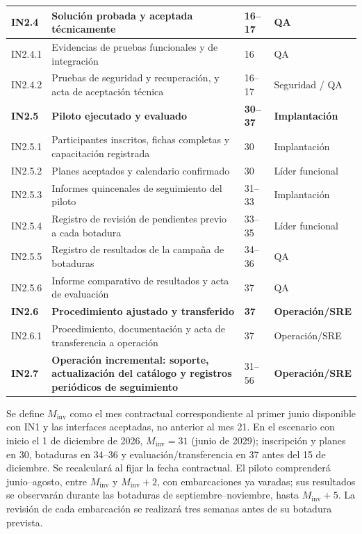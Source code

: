 \begin{longtable}{
L{\tabcolsep\relax}
L{\tabcolsep\relax}
L{\tabcolsep\relax}
L{\tabcolsep\relax}
}
\textbf{IN2.4} &
\textbf{Solución probada y aceptada técnicamente} &
\textbf{16--17} &
\textbf{QA} \\
\hline
IN2.4.1 & Evidencias de pruebas funcionales y de integración &
16 & QA \\
\hline
IN2.4.2 & Pruebas de seguridad y recuperación, y acta de aceptación técnica &
16--17 & Seguridad / QA \\
\hline

\textbf{IN2.5} &
\textbf{Piloto ejecutado y evaluado} &
\textbf{30--37} &
\textbf{Implantación} \\
\hline
IN2.5.1 & Participantes inscritos, fichas completas y capacitación registrada &
30 & Implantación \\
\hline
IN2.5.2 & Planes aceptados y calendario confirmado &
30 & Líder funcional \\
\hline
IN2.5.3 & Informes quincenales de seguimiento del piloto &
31--33 &
Implantación \\
\hline
IN2.5.4 & Registro de revisión de pendientes previo a cada botadura &
33--35 &
Líder funcional \\
\hline
IN2.5.5 & Registro de resultados de la campaña de botaduras &
34--36 &
QA \\
\hline
IN2.5.6 & Informe comparativo de resultados y acta de evaluación &
37 & QA \\
\hline

\textbf{IN2.6} &
\textbf{Procedimiento ajustado y transferido} &
\textbf{37} &
\textbf{Operación/SRE} \\
\hline
IN2.6.1 & Procedimiento, documentación y acta de transferencia a operación &
37 & Operación/SRE \\
\hline

\textbf{IN2.7} &
\textbf{Operación incremental: soporte, actualización del catálogo
y registros periódicos de seguimiento} &
31--56 &
\textbf{Operación/SRE} \\
\hline

\end{longtable}

Se define $M_{\mathrm{inv}}$ como el mes contractual correspondiente
al primer junio disponible con IN1 y las interfaces aceptadas,
no anterior al mes 21. En el escenario con inicio el 1 de diciembre de 2026, $M_{\mathrm{inv}}=31$ (junio de 2029); inscripción y planes en 30, botaduras en 34--36 y evaluación/transferencia en 37 antes del 15 de diciembre. Se recalculará al fijar la fecha contractual. El piloto comprenderá
junio--agosto, entre $M_{\mathrm{inv}}$ y
$M_{\mathrm{inv}}+2$, con embarcaciones ya varadas; sus resultados
se observarán durante las botaduras de septiembre--noviembre,
hasta $M_{\mathrm{inv}}+5$. La revisión de cada embarcación se
realizará tres semanas antes de su botadura prevista.

